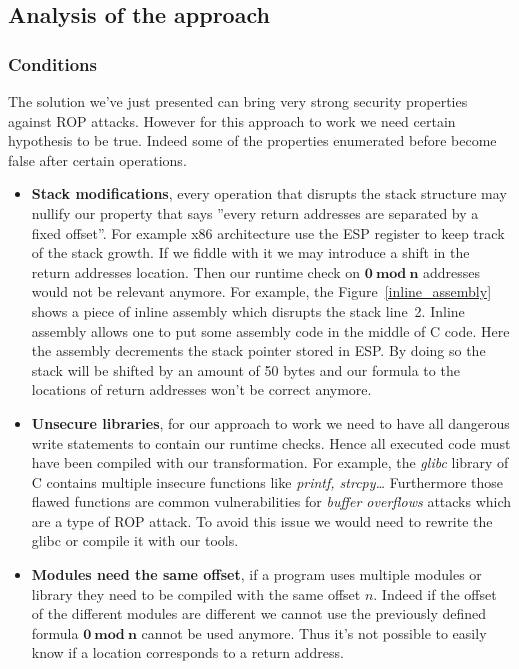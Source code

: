 \documentclass[11pt]{sdm}
\begin{document}
\subsection{Analysis of the approach}
\label{sub:Analysis of the approach}

\subsubsection{Conditions}
\label{ssub:Conditions}

The solution we've just presented can bring very strong security properties against ROP attacks. However for this approach to work we need certain hypothesis to be true. Indeed some of the properties enumerated before become false after certain operations.

\begin{itemize}
	\item \textbf{Stack modifications}, every operation that disrupts the stack structure may nullify our property that says ''every return addresses are separated by a fixed offset''. For example x86 architecture use the ESP register to keep track of the stack growth. If we fiddle with it we may introduce a shift in the return addresses location. Then our runtime check on $\mathbf{0~mod~n}$ addresses would not be relevant anymore.
		For example, the Figure~\ref{inline_assembly} shows a piece of inline assembly which disrupts the stack line~2. Inline assembly allows one to put some assembly code in the middle of C code. Here the assembly decrements the stack pointer stored in ESP. By doing so the stack will be shifted by an amount of 50 bytes and our formula to the locations of return addresses won't be correct anymore.

	\item \textbf{Unsecure libraries}, for our approach to work we need to have all dangerous write statements to contain our runtime checks. Hence all executed code must have been compiled with our transformation. For example, the \textit{glibc} library of C contains multiple insecure functions like \textit{printf, strcpy\dots} Furthermore those flawed functions are common vulnerabilities for \textit{buffer overflows} attacks which are a type of ROP attack. To avoid this issue we would need to rewrite the glibc or compile it with our tools.

	\item \textbf{Modules need the same offset}, if a program uses multiple modules or library they need to be compiled with the same offset $n$. Indeed if the offset of the different modules are different we cannot use the previously defined formula $\mathbf{0~mod~n}$ cannot be used anymore. Thus it's not possible to easily know if a location corresponds to a return address.
\end{itemize}
\end{document}
